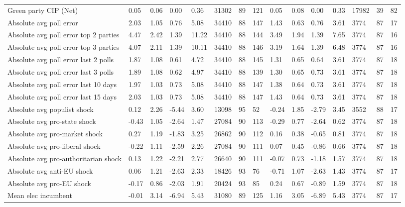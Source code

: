 \begin{longtable}{lllllllllllllll}
Green party CIP (Net) & 0.05 & 0.06 & 0.00 & 0.36 & 31302 & 89 & 121 & 0.05 & 0.08 & 0.00 & 0.33 & 17982 & 39 & 82\\
Absolute avg poll error & 2.03 & 1.05 & 0.76 & 5.08 & 34410 & 88 & 147 & 1.43 & 0.63 & 0.76 & 3.61 & 3774 & 87 & 17\\
Absolute avg poll error top 2 parties & 4.47 & 2.42 & 1.39 & 11.22 & 34410 & 88 & 144 & 3.49 & 1.94 & 1.39 & 7.65 & 3774 & 87 & 16\\
Absolute avg poll error top 3 parties & 4.07 & 2.11 & 1.39 & 10.11 & 34410 & 88 & 146 & 3.19 & 1.64 & 1.39 & 6.48 & 3774 & 87 & 16\\
Absolute avg poll error last 2 polls & 1.87 & 1.08 & 0.61 & 4.72 & 34410 & 88 & 145 & 1.31 & 0.65 & 0.64 & 3.61 & 3774 & 87 & 18\\
\addlinespace
Absolute avg poll error last 3 polls & 1.89 & 1.08 & 0.62 & 4.97 & 34410 & 88 & 139 & 1.30 & 0.65 & 0.73 & 3.61 & 3774 & 87 & 18\\
Absolute avg poll error last 10 days & 1.97 & 1.03 & 0.73 & 5.08 & 34410 & 88 & 147 & 1.38 & 0.64 & 0.73 & 3.61 & 3774 & 87 & 18\\
Absolute avg poll error last 15 days & 2.03 & 1.03 & 0.73 & 5.08 & 34410 & 88 & 147 & 1.43 & 0.64 & 0.73 & 3.61 & 3774 & 87 & 18\\
Absolute avg populist shock & 0.12 & 2.26 & -5.44 & 3.60 & 13098 & 95 & 52 & -0.24 & 1.85 & -2.79 & 3.45 & 3552 & 88 & 17\\
Absolute avg pro-state shock & -0.43 & 1.05 & -2.64 & 1.47 & 27084 & 90 & 113 & -0.29 & 0.77 & -2.64 & 0.62 & 3774 & 87 & 18\\
\addlinespace
Absolute avg pro-market shock & 0.27 & 1.19 & -1.83 & 3.25 & 26862 & 90 & 112 & 0.16 & 0.38 & -0.65 & 0.81 & 3774 & 87 & 18\\
Absolute avg pro-liberal shock & -0.22 & 1.11 & -2.59 & 2.26 & 27084 & 90 & 111 & 0.07 & 0.45 & -0.86 & 0.66 & 3774 & 87 & 18\\
Absolute avg pro-authoritarian shock & 0.13 & 1.22 & -2.21 & 2.77 & 26640 & 90 & 111 & -0.07 & 0.73 & -1.18 & 1.57 & 3774 & 87 & 18\\
Absolute avg anti-EU shock & 0.06 & 1.21 & -2.63 & 2.33 & 18426 & 93 & 76 & -0.71 & 1.07 & -2.63 & 1.43 & 3774 & 87 & 17\\
Absolute avg pro-EU shock & -0.17 & 0.86 & -2.03 & 1.91 & 20424 & 93 & 85 & 0.24 & 0.67 & -0.89 & 1.59 & 3774 & 87 & 18\\
\addlinespace
Mean elec incumbent & -0.01 & 3.14 & -6.94 & 5.43 & 31080 & 89 & 125 & 1.16 & 3.05 & -6.89 & 5.43 & 3774 & 87 & 17\\

\end{longtable}
